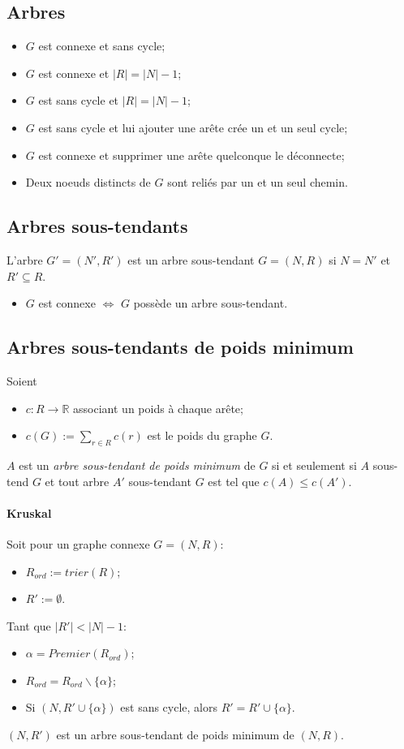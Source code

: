 \subsection{Arbres}
\begin{itemize}
  \item $G$ est connexe et sans cycle;
  \item $G$ est connexe et $|R| = |N| - 1$;
  \item $G$ est sans cycle et $|R| = |N| - 1$;
  \item $G$ est sans cycle et lui ajouter une arête crée un et un seul cycle;
  \item $G$ est connexe et supprimer une arête quelconque le déconnecte;
  \item Deux noeuds distincts de $G$ sont reliés par un et un seul chemin.
\end{itemize}

\subsection{Arbres sous-tendants}
L'arbre $G' = (N', R')$ est un arbre sous-tendant
$G = (N,R)$ si $N = N'$ et $R' \subseteq R$.

\begin{itemize}
  \item $G$ est connexe $\Leftrightarrow$ $G$ possède un arbre sous-tendant.
\end{itemize}

\subsection{Arbres sous-tendants de poids minimum}
Soient
\begin{itemize}
  \item $c : R \rightarrow \mathbb{R}$ associant un poids à chaque arête;
  \item $c(G) := \sum_{r \in R}c(r)$ est le poids du graphe $G$.
\end{itemize}
$A$ est un \emph{arbre sous-tendant de poids minimum} de $G$
si et seulement si $A$ sous-tend $G$ et tout arbre
$A'$ sous-tendant $G$ est tel que $c(A) \leq c(A')$.

\paragraph{Kruskal}
Soit pour un graphe connexe $G = (N,R)$:
\begin{itemize}
  \item $R_{ord} := trier(R)$;
  \item $R' := \emptyset$.
\end{itemize}
Tant que $|R'| < |N| - 1$:
\begin{itemize}
  \item $\alpha = Premier(R_{ord})$;
  \item $R_{ord} = R_{ord}\backslash\{\alpha\}$;
  \item Si $(N, R' \cup \{\alpha\})$ est sans cycle,
    alors $R' = R' \cup \{\alpha\}$.
\end{itemize}
$(N, R')$ est un arbre sous-tendant de poids minimum de $(N, R)$.

